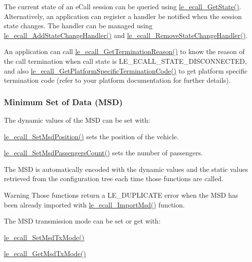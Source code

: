 The current state of an e\+Call session can be queried using \hyperlink{le__ecall__interface_8h_a7881e794b9249222edde10f76d7663c9}{le\+\_\+ecall\+\_\+\+Get\+State()}. Alternatively, an application can register a handler be notified when the session state changes. The handler can be managed using \hyperlink{le__ecall__interface_8h_a453b64579f2884f1d26981bca38a201c}{le\+\_\+ecall\+\_\+\+Add\+State\+Change\+Handler()} and \hyperlink{le__ecall__interface_8h_a6be1fd10666da25882a2c6f78c82664d}{le\+\_\+ecall\+\_\+\+Remove\+State\+Change\+Handler()}.

An application can call \hyperlink{le__ecall__interface_8h_a771b2ef399a8fbf3b80c4eb11152c06a}{le\+\_\+ecall\+\_\+\+Get\+Termination\+Reason()} to know the reason of the call termination when call state is L\+E\+\_\+\+E\+C\+A\+L\+L\+\_\+\+S\+T\+A\+T\+E\+\_\+\+D\+I\+S\+C\+O\+N\+N\+E\+C\+T\+E\+D, and also \hyperlink{le__ecall__interface_8h_a8ffb7fb207537ea4574823285ebb6ca1}{le\+\_\+ecall\+\_\+\+Get\+Platform\+Specific\+Termination\+Code()} to get platform specific termination code (refer to your platform documentation for further details).\hypertarget{c_ecall_le_ecall_msd}{}\subsubsection{Minimum Set of Data (\+M\+S\+D)}\label{c_ecall_le_ecall_msd}
The dynamic values of the M\+S\+D can be set with\+:
\begin{DoxyItemize}
\item \hyperlink{le__ecall__interface_8h_a2b56b7b7fd7f936c144d30eba7815908}{le\+\_\+ecall\+\_\+\+Set\+Msd\+Position()} sets the position of the vehicle.
\item \hyperlink{le__ecall__interface_8h_a8c009bb03d61dcd0ffbd9e986b692a85}{le\+\_\+ecall\+\_\+\+Set\+Msd\+Passengers\+Count()} sets the number of passengers.
\end{DoxyItemize}

The M\+S\+D is automatically encoded with the dynamic values and the static values retrieved from the configuration tree each time those functions are called.

\begin{DoxyWarning}{Warning}
Those functions return a L\+E\+\_\+\+D\+U\+P\+L\+I\+C\+A\+T\+E error when the M\+S\+D has been already imported with \hyperlink{le__ecall__interface_8h_a85c4c3b921b9a6b0bc10f9400e58113e}{le\+\_\+ecall\+\_\+\+Import\+Msd()} function.
\end{DoxyWarning}
The M\+S\+D transmission mode can be set or get with\+:
\begin{DoxyItemize}
\item \hyperlink{le__ecall__interface_8h_a00d3dbc99884375cf2487d6640767c40}{le\+\_\+ecall\+\_\+\+Set\+Msd\+Tx\+Mode()}
\item \hyperlink{le__ecall__interface_8h_a4319df67dc451fecb72e4e60ba7b6f6e}{le\+\_\+ecall\+\_\+\+Get\+Msd\+Tx\+Mode()}
\end{DoxyItemize}

